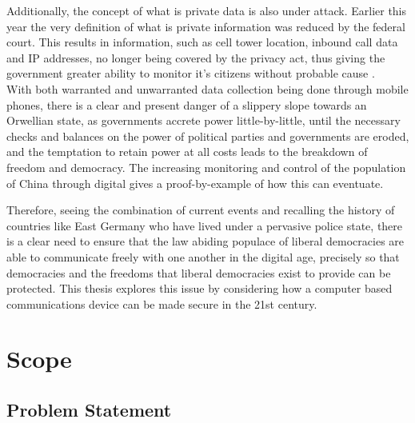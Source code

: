 Additionally, the concept of what is private data is also under attack.
Earlier this year the very definition of what is private information was reduced by the federal court.
This results in information, such as cell tower location, inbound call data and IP addresses, no longer being covered by the privacy act, thus giving the government greater ability to monitor it's citizens without probable cause \cite{Reference37}.\\
With both warranted and unwarranted data collection being done through mobile phones, there is a clear and present danger of a slippery slope towards an Orwellian state, as governments accrete power little-by-little, until the necessary checks and balances on the power of political parties and governments are eroded, and the temptation to retain power at all costs leads to the breakdown of freedom and democracy.  The increasing monitoring and control of the population of China through digital gives a proof-by-example of how this can eventuate.

Therefore, seeing the combination of current events and recalling the history of countries like East Germany who have lived under a pervasive police state, there is a clear need to ensure that the law abiding populace of liberal democracies are able to communicate freely with one another in the digital age, precisely so that democracies and the freedoms that liberal democracies exist to provide can be protected.
This thesis explores this issue by considering how a computer based communications device can be made secure in the 21st century.


\section{Scope}

\label{Ch1 Sec2}


\subsection{Problem Statement}

\label{Ch1 Sec2 Sub1}

